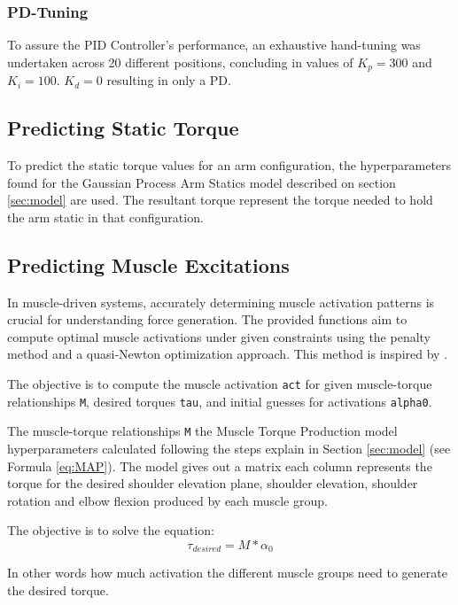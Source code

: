 \subsubsection{PD-Tuning}
To assure the PID Controller's performance, an exhaustive hand-tuning was undertaken across 20 different positions, concluding in values of \(K_p = 300\) and \(K_i = 100\). \(K_d = 0\) resulting in only a PD. 

\subsection{Predicting Static Torque}

To predict the static torque values for an arm configuration, the hyperparameters found for the Gaussian Process Arm Statics model described on section \ref{sec:model} are used. The resultant torque represent the torque needed to hold the arm static in that configuration.

\subsection{Predicting Muscle Excitations}\label{computemuscleexcitation}

In muscle-driven systems, accurately determining muscle activation patterns is crucial for understanding force generation. The provided functions aim to compute optimal muscle activations under given constraints using the penalty method and a quasi-Newton optimization approach. This method is inspired by \cite{QSC}.

The objective is to compute the muscle activation \texttt{act} for given muscle-torque relationships \texttt{M}, desired torques \texttt{tau}, and initial guesses for activations \texttt{alpha0}.

The muscle-torque relationships \texttt{M} the Muscle Torque Production model hyperparameters calculated following the steps explain in Section \ref{sec:model} (see Formula \ref{eq:MAP}). The model gives out a matrix each column represents the torque for the desired shoulder elevation plane, shoulder elevation, shoulder rotation and elbow flexion produced by each muscle group. 

The objective is to solve the equation:
\begin{equation}
    \tau_{desired} = M * \alpha_0
\end{equation}

In other words how much activation the different muscle groups need to generate the desired torque. 

